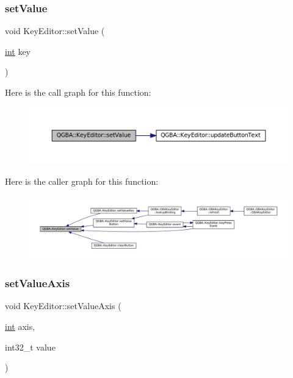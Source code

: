 \subsubsection{\texorpdfstring{set\+Value}{setValue}}
{\footnotesize\ttfamily void Key\+Editor\+::set\+Value (\begin{DoxyParamCaption}\item[{\mbox{\hyperlink{ioapi_8h_a787fa3cf048117ba7123753c1e74fcd6}{int}}}]{key }\end{DoxyParamCaption})\hspace{0.3cm}{\ttfamily [slot]}}

Here is the call graph for this function\+:
\nopagebreak
\begin{figure}[H]
\begin{center}
\leavevmode
\includegraphics[width=350pt]{class_q_g_b_a_1_1_key_editor_af9e4f2efe7c3edb632a31135b413c73b_cgraph}
\end{center}
\end{figure}
Here is the caller graph for this function\+:
\nopagebreak
\begin{figure}[H]
\begin{center}
\leavevmode
\includegraphics[width=350pt]{class_q_g_b_a_1_1_key_editor_af9e4f2efe7c3edb632a31135b413c73b_icgraph}
\end{center}
\end{figure}
\mbox{\label{class_q_g_b_a_1_1_key_editor_a55a17cb898ce452a4060355fbe431371}} 
\subsubsection{\texorpdfstring{set\+Value\+Axis}{setValueAxis}}
{\footnotesize\ttfamily void Key\+Editor\+::set\+Value\+Axis (\begin{DoxyParamCaption}\item[{\mbox{\hyperlink{ioapi_8h_a787fa3cf048117ba7123753c1e74fcd6}{int}}}]{axis,  }\item[{int32\+\_\+t}]{value }\end{DoxyParamCaption})\hspace{0.3cm}{\ttfamily [slot]}}

